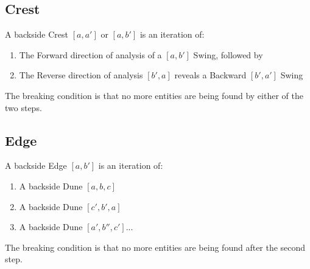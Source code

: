 \documentclass{report}
\begin{document}
\subsection{Crest}
A backside Crest $[a,a']$ or $[a,b']$ is an iteration of:
\begin{enumerate}
\item The Forward direction of analysis of a $[a,b']$ Swing, followed by 
\item The Reverse direction of analysis $[b',a]$ reveals a Backward $[b',a']$ Swing
\end{enumerate}
The breaking condition is that no more entities are being found by either of the two steps.

\subsection{Edge}
A backside Edge $[a,b']$ is an iteration of:
\begin{enumerate}
\item A backside Dune $[a,b,c]$
\item A backside Dune $[c',b',a]$ 
\item A backside Dune $[a',b'',c']$...
\end{enumerate}
The breaking condition is that no more entities are being found after the second step.
\end{document}
